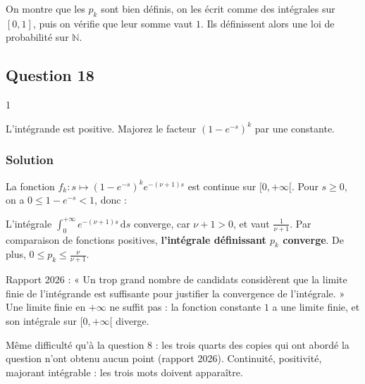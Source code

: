 \documentclass[11pt,a4paper]{article}
\newcommand{\equationajustee}[1]{%
  \sbox{\boiteequation}{$\displaystyle #1$}%
  \ifdim\wd\boiteequation>\linewidth
    \[\resizebox{\linewidth}{!}{\usebox{\boiteequation}}\]%
  \else
    \[#1\]%
  \fi}
\begin{document}
On montre que les \(p_k\) sont bien définis, on les écrit comme des intégrales sur \([0,1]\), puis on vérifie que leur somme vaut \(1\). Ils définissent alors une loi de probabilité sur \(\mathbb N\).

\hypertarget{question-18}{%
\subsection{Question 18}\label{question-18}}

\begin{indication}{1}

L'intégrande est positive. Majorez le facteur \((1-e^{-s})^k\) par une constante.

\end{indication}

\hypertarget{solution-22}{%
\subsubsection{Solution}\label{solution-22}}

La fonction \(f_k:s\mapsto(1-e^{-s})^ke^{-(\nu+1)s}\) est continue sur \([0,+\infty[\). Pour \(s\ge0\), on a \(0\le1-e^{-s}<1\), donc :

\equationajustee{0\le f_k(s)\le e^{-(\nu+1)s}.}

L'intégrale \(\int_0^{+\infty}e^{-(\nu+1)s}\,\mathrm ds\) converge, car \(\nu+1>0\), et vaut \(\frac1{\nu+1}\). Par comparaison de fonctions positives, \textbf{l'intégrale définissant \(p_k\) converge}. De plus, \(0\le p_k\le\frac\nu{\nu+1}\).

\begin{piege}

Rapport 2026 : « Un trop grand nombre de candidats considèrent que la limite finie de l'intégrande est suffisante pour justifier la convergence de l'intégrale. » Une limite finie en \(+\infty\) ne suffit pas : la fonction constante \(1\) a une limite finie, et son intégrale sur \([0,+\infty[\) diverge.

\end{piege}

\begin{jury}

Même difficulté qu'à la question 8 : les trois quarts des copies qui ont abordé la question n'ont obtenu aucun point (rapport 2026). Continuité, positivité, majorant intégrable : les trois mots doivent apparaître.

\end{jury}
\end{document}

